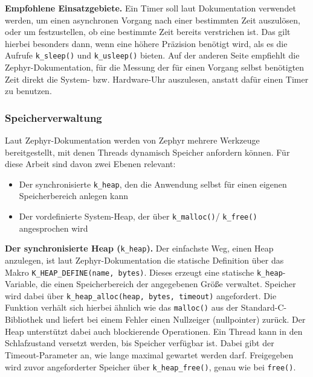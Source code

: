 \textbf{Empfohlene Einsatzgebiete.} Ein Timer soll laut Dokumentation verwendet werden, um einen asynchronen Vorgang nach einer bestimmten Zeit auszul{\"o}sen, oder um festzustellen, ob eine bestimmte Zeit bereits verstrichen ist. Das gilt hierbei besonders dann, wenn eine h{\"o}here Pr{\"a}zision ben{\"o}tigt wird, als es die Aufrufe \lstinline[style=codeinline]|k_sleep()| und \lstinline[style=codeinline]|k_usleep()| bieten. Auf der anderen Seite empfiehlt die Zephyr-Dokumentation, f{\"u}r die Messung der f{\"u}r einen Vorgang selbst ben{\"o}tigten Zeit direkt die System- bzw. Hardware-Uhr auszulesen, anstatt daf{\"u}r einen Timer zu benutzen.

\subsubsection{Speicherverwaltung}
Laut Zephyr-Dokumentation werden von Zephyr mehrere Werkzeuge bereitgestellt, mit denen Threads dynamisch Speicher anfordern k{\"o}nnen. F{\"u}r diese Arbeit sind davon zwei Ebenen relevant:

\begin{itemize}
\item Der synchronisierte \lstinline[style=codeinline]|k_heap|, den die Anwendung selbst f{\"u}r einen eigenen Speicherbereich anlegen kann
\item Der vordefinierte System-Heap, der {\"u}ber \lstinline[style=codeinline]|k_malloc()|/ \lstinline[style=codeinline]|k_free()| angesprochen wird
\end{itemize}
\textbf{Der synchronisierte Heap (}\lstinline[style=codeinline]|k_heap|\textbf{).} Der einfachste Weg, einen Heap anzulegen, ist laut Zephyr-Dokumentation die statische Definition {\"u}ber das Makro \lstinline[style=codeinline]|K_HEAP_DEFINE(name, bytes)|. Dieses erzeugt eine statische \lstinline[style=codeinline]|k_heap|-Variable, die einen Speicherbereich der angegebenen Gr{\"o}{\ss}e verwaltet. Speicher wird dabei {\"u}ber \lstinline[style=codeinline]|k_heap_alloc(heap, bytes, timeout)| angefordert. Die Funktion verh{\"a}lt sich hierbei {\"a}hnlich wie das \lstinline[style=codeinline]|malloc()| aus der Standard-C-Bibliothek und liefert bei einem Fehler einen Nullzeiger (nullpointer) zur{\"u}ck. Der Heap unterst{\"u}tzt dabei auch blockierende Operationen. Ein Thread kann in den Schlafzustand versetzt werden, bis Speicher verf{\"u}gbar ist. Dabei gibt der Timeout-Parameter an, wie lange maximal gewartet werden darf. Freigegeben wird zuvor angeforderter Speicher {\"u}ber \lstinline[style=codeinline]|k_heap_free()|, genau wie bei \lstinline[style=codeinline]|free()|.

